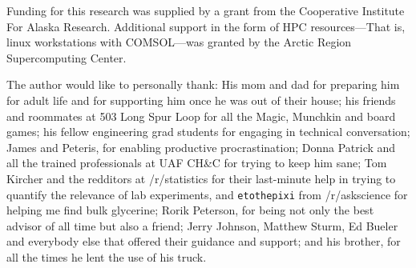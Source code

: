 Funding for this research was supplied by a grant from the Cooperative Institute
For Alaska Research. Additional support in the form of HPC resources---That is, 
linux workstations with COMSOL---was granted by the Arctic Region Supercomputing
Center.

The author would like to personally thank: His mom and dad for preparing him for
adult life and for supporting him once he was out of their house;
his friends and roommates at 503 Long Spur Loop for all the Magic, Munchkin and
board games;
his fellow engineering grad students for engaging in technical conversation;
James and Peteris, for enabling productive procrastination;
Donna Patrick and all the trained professionals at UAF CH\&C for trying to keep him sane;
Tom Kircher and the redditors at /r/statistics for their last-minute help in trying to quantify the relevance of lab experiments, and \texttt{etothepixi} from /r/askscience for
helping me find bulk glycerine;
Rorik Peterson, for being not only the best advisor of all time but also a friend;
Jerry Johnson, Matthew Sturm, Ed Bueler and everybody else that offered their guidance and support; 
and his brother, for all the times he lent the use of his truck.
